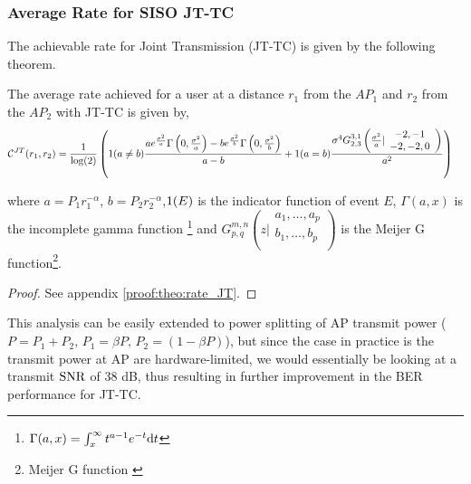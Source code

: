 \subsubsection{Average Rate for SISO JT-TC}
The achievable rate for Joint Transmission (JT-TC) is given by the following theorem.
\begin{theorem}
\label{theo:rate_JT}
The average rate achieved for a user at a distance $r_1$ from the $AP_1$ and $r_2$ from the $AP_2$ with JT-TC is given by,	
\begin{align}
    \label{eqn:rate_jt_siso}
    \mathcal{C}^{JT}(r_1,r_2)&=
    \frac{1}{\log(2)}\left(1( a\neq b )\frac{ 
    a e^{\frac{\sigma ^2}{a}} \Gamma
    \left(0,\frac{\sigma ^2}{a}\right)
    -b e^{\frac{\sigma ^2}{b}} \Gamma
    \left(0,\frac{\sigma ^2}{b}\right)}{a-b} + 
    1(a= b)\frac{\sigma ^4 G_{2,3}^{3,1}\left(\frac{\sigma^2}{a}|
	\begin{array}{c}
    	-2,-1 \\
    	-2,-2,0 \\
	\end{array}
	\right)}{a^2}\right)   
\end{align}

where $a=P_1r_1^{-\alpha}$, $b=P_2r_2^{-\alpha}$,$1(E)$ is the indicator function of event $E$, $\Gamma(a,x)$ is the incomplete gamma function \footnote{$\Gamma(a,x)=\int_{x}^{\infty} t^{a-1}e^{-t}\mathrm{d} t$} and $G_{p,q}^{m,n}\left(z|
\begin{array}{c}
a_1, \hdots, a_p \\
b_1, \hdots, b_p \\
\end{array}
\right)$ is the Meijer G function\footnote{Meijer G function \cite{reference_meijerg}}.
\end{theorem}

\begin{proof}
	See appendix \ref{proof:theo:rate_JT}.	
\end{proof}
This analysis can be easily extended to power splitting of AP transmit power ($P=P_1+P_2,\, P_1=\beta P,\, P_2=(1-\beta P)$), but since the case in practice is the transmit power at AP are hardware-limited, we would essentially be looking at a transmit $\text{SNR}$ of $38$ dB, thus resulting in further improvement in the BER performance for JT-TC.



